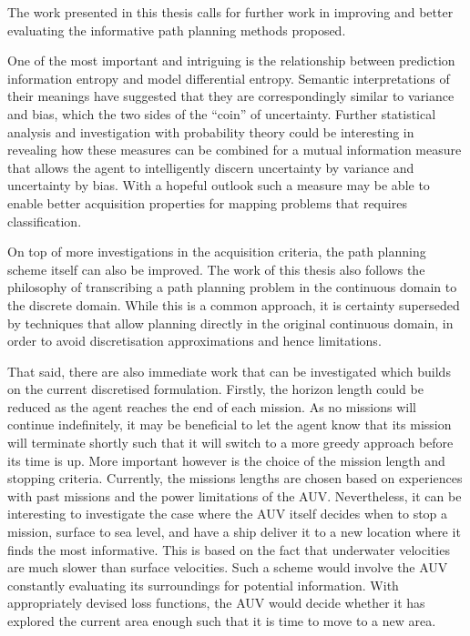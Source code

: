 	The work presented in this thesis calls for further work in improving and better evaluating the informative path planning methods proposed.
	
	One of the most important and intriguing is the relationship between prediction information entropy and model differential entropy. Semantic interpretations of their meanings have suggested that they are correspondingly similar to variance and bias, which the two sides of the ``coin'' of uncertainty. Further statistical analysis and investigation with probability theory could be interesting in revealing how these measures can be combined for a mutual information measure that allows the agent to intelligently discern uncertainty by variance and uncertainty by bias. With a hopeful outlook such a measure may be able to enable better acquisition properties for mapping problems that requires classification.
	
	On top of more investigations in the acquisition criteria, the path planning scheme itself can also be improved. The work of this thesis also follows the philosophy of transcribing a path planning problem in the continuous domain to the discrete domain. While this is a common approach, it is certainty superseded by techniques that allow planning directly in the original continuous domain, in order to avoid discretisation approximations and hence limitations. 
	
	That said, there are also immediate work that can be investigated which builds on the current discretised formulation. Firstly, the horizon length could be reduced as the agent reaches the end of each mission. As no missions will continue indefinitely, it may be beneficial to let the agent know that its mission will terminate shortly such that it will switch to a more greedy approach before its time is up. More important however is the choice of the mission length and stopping criteria. Currently, the missions lengths are chosen based on experiences with past missions and the power limitations of the AUV. Nevertheless, it can be interesting to investigate the case where the AUV itself decides when to stop a mission, surface to sea level, and have a ship deliver it to a new location where it finds the most informative. This is based on the fact that underwater velocities are much slower than surface velocities. Such a scheme would involve the AUV constantly evaluating its surroundings for potential information. With appropriately devised loss functions, the AUV would decide whether it has explored the current area enough such that it is time to move to a new area.
		
